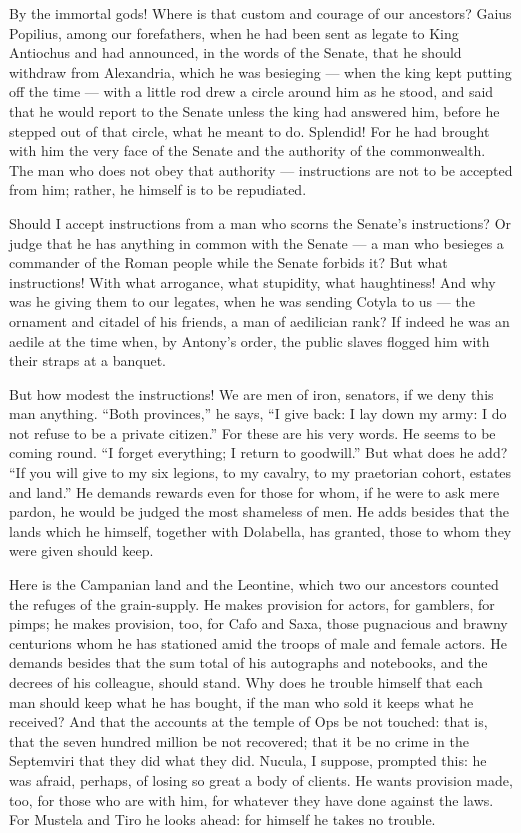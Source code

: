  By the immortal gods! Where is that custom and courage of our ancestors? Gaius Popilius, among our forefathers, when he had been sent as legate to King Antiochus and had announced, in the words of the Senate, that he should withdraw from Alexandria, which he was besieging --- when the king kept putting off the time --- with a little rod drew a circle around him as he stood, and said that he would report to the Senate unless the king had answered him, before he stepped out of that circle, what he meant to do. Splendid! For he had brought with him the very face of the Senate and the authority of the commonwealth. The man who does not obey that authority --- instructions are not to be accepted from him; rather, he himself is to be repudiated.

 Should I accept instructions from a man who scorns the Senate's instructions? Or judge that he has anything in common with the Senate --- a man who besieges a commander of the Roman people while the Senate forbids it? But what instructions! With what arrogance, what stupidity, what haughtiness! And why was he giving them to our legates, when he was sending Cotyla to us --- the ornament and citadel of his friends, a man of aedilician rank? If indeed he was an aedile at the time when, by Antony's order, the public slaves flogged him with their straps at a banquet.

 But how modest the instructions! We are men of iron, senators, if we deny this man anything. ``Both provinces,'' he says, ``I give back: I lay down my army: I do not refuse to be a private citizen.'' For these are his very words. He seems to be coming round. ``I forget everything; I return to goodwill.'' But what does he add? ``If you will give to my six legions, to my cavalry, to my praetorian cohort, estates and land.'' He demands rewards even for those for whom, if he were to ask mere pardon, he would be judged the most shameless of men. He adds besides that the lands which he himself, together with Dolabella, has granted, those to whom they were given should keep.

 Here is the Campanian land and the Leontine, which two our ancestors counted the refuges of the grain-supply. He makes provision for actors, for gamblers, for pimps; he makes provision, too, for Cafo and Saxa, those pugnacious and brawny centurions whom he has stationed amid the troops of male and female actors. He demands besides that the sum total of his autographs and notebooks, and the decrees of his colleague, should stand. Why does he trouble himself that each man should keep what he has bought, if the man who sold it keeps what he received? And that the accounts at the temple of Ops be not touched: that is, that the seven hundred million be not recovered; that it be no crime in the Septemviri that they did what they did. Nucula, I suppose, prompted this: he was afraid, perhaps, of losing so great a body of clients. He wants provision made, too, for those who are with him, for whatever they have done against the laws. For Mustela and Tiro he looks ahead: for himself he takes no trouble.

